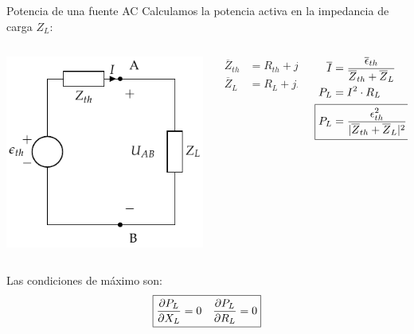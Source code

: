 \documentclass[aspectratio=169, usenames,svgnames,dvipsnames]{beamer}
\begin{document}
\begin{frame}[label={sec:orgf032576}]{Potencia de una fuente AC}
Calculamos la potencia activa en la impedancia de carga \(Z_L\):
\begin{columns}
\begin{column}{0.3\columnwidth}
\begin{center}
\includegraphics[height=0.45\textheight]{../figs/EquivalenteThevenin0.pdf}
\end{center}
\end{column}

\begin{column}{0.2\columnwidth}
\begin{align*}
  \overline{Z}_{th} &= R_{th} + jX_{th}\\
  \overline{Z}_L &= R_L + jX_L\\
\end{align*}
\end{column}

\begin{column}{0.4\columnwidth}
\begin{align*}
\overline{I} &= \frac{\overline{\epsilon}_{th}}{\overline{Z}_{th} + \overline{Z}_L}\\
P_L &= I^2 \cdot R_L\\
\Aboxed{P_L &= \frac{\epsilon^2_{th}}{|\overline{Z}_{th} + \overline{Z}_L|^2} \cdot R_L}
\end{align*}
\end{column}
\end{columns}

Las condiciones de máximo son: 
\[
  \boxed{%
    \diffp{P_L}{X_L} = 0 \quad%
    \diffp{P_L}{R_L} = 0%
  }
\]
\end{frame}
\end{document}
